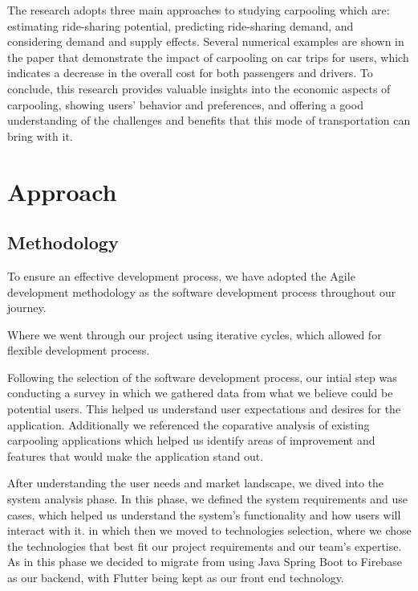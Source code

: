 \documentclass[a4paper, 12pt]{report} %
\begin{document}
                The research adopts three main approaches to studying carpooling which are: estimating ride-sharing potential, predicting ride-sharing demand, and considering demand and supply effects. Several numerical examples are shown in the paper that demonstrate the impact of carpooling on car trips for users, which indicates a decrease in the overall cost for both passengers and drivers.
                To conclude, this research provides valuable insights into the economic aspects of carpooling, showing users’ behavior and preferences, and offering a good understanding of the challenges and benefits that this mode of transportation can bring with it. \cite{carpool_challenge}
    \pagebreak

    \section{Approach}  
        \subsection{Methodology}
            To ensure an effective development process, we have adopted the Agile development methodology \cite{agile_method} as the software development process throughout our journey.
            
            Where we went through our project using iterative cycles, which allowed for flexible development process.

            Following the selection of the software development process, our intial step was conducting a survey in which we gathered data from what we believe could be potential users. This helped us understand user 
            expectations and desires for the application. Additionally we referenced the coparative analysis of existing carpooling applications which helped us identify areas of improvement and features that would make the application stand out.

            After understanding the user needs and market landscape, we dived into the system analysis phase. In this phase, we defined the system requirements and use cases, which helped us understand the system's functionality and how users will interact with it.
            in which then we moved to technologies selection, where we chose the technologies that best fit our project requirements and our team's expertise. As in this phase we decided to migrate from using Java Spring Boot to Firebase as our backend, with Flutter being kept as our front end technology.
\end{document}
